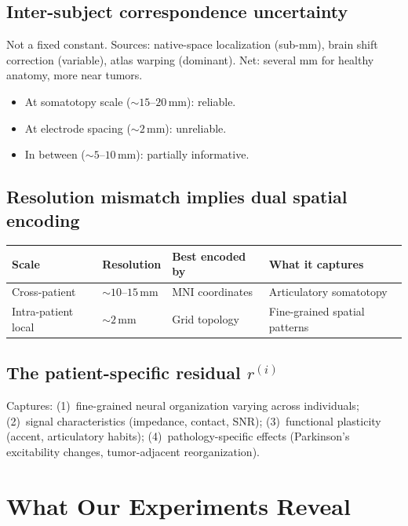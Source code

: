 \documentclass[11pt,letterpaper]{article}
\begin{document}
\subsection{Inter-subject correspondence uncertainty}

Not a fixed constant. Sources: native-space localization (sub-mm), brain shift correction (variable), atlas warping (dominant). Net: several mm for healthy anatomy, more near tumors.
\begin{itemize}[leftmargin=2em]
\item At somatotopy scale (${\sim}15$--$20$\,mm): reliable.
\item At electrode spacing (${\sim}2$\,mm): unreliable.
\item In between (${\sim}5$--$10$\,mm): partially informative.
\end{itemize}

\subsection{Resolution mismatch implies dual spatial encoding}

\begin{table}[ht!]
\centering\small
\begin{tabular}{@{}llll@{}}
\toprule
\textbf{Scale} & \textbf{Resolution} & \textbf{Best encoded by} & \textbf{What it captures} \\
\midrule
Cross-patient & ${\sim}10$--$15$\,mm & MNI coordinates & Articulatory somatotopy \\
Intra-patient local & ${\sim}2$\,mm & Grid topology & Fine-grained spatial patterns \\
\bottomrule
\end{tabular}
\end{table}

\subsection{The patient-specific residual \texorpdfstring{$r^{(i)}$}{r(i)}}

Captures: (1)~fine-grained neural organization varying across individuals; (2)~signal characteristics (impedance, contact, SNR); (3)~functional plasticity (accent, articulatory habits); (4)~pathology-specific effects (Parkinson's excitability changes, tumor-adjacent reorganization).


\section{What Our Experiments Reveal}\label{sec:experiments}
\end{document}
